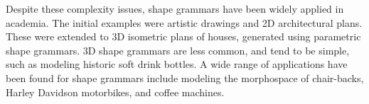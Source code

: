 



Despite these complexity issues, shape grammars have been widely applied in academia. The initial examples were artistic drawings\cite{Stiny71} and 2D architectural plans\cite{Stiny78}. These were extended to 3D isometric plans of houses, generated using parametric shape grammars\cite{Koning81}. 3D shape grammars are less common, and tend to be simple, such as modeling historic soft drink bottles\cite{Chau04}. A wide range of applications have been found for shape grammars include modeling the morphospace of chair-backs\cite{Knight80}, Harley Davidson motorbikes\cite{Pugliese02}, and coffee machines\cite{Agarwal98}.


